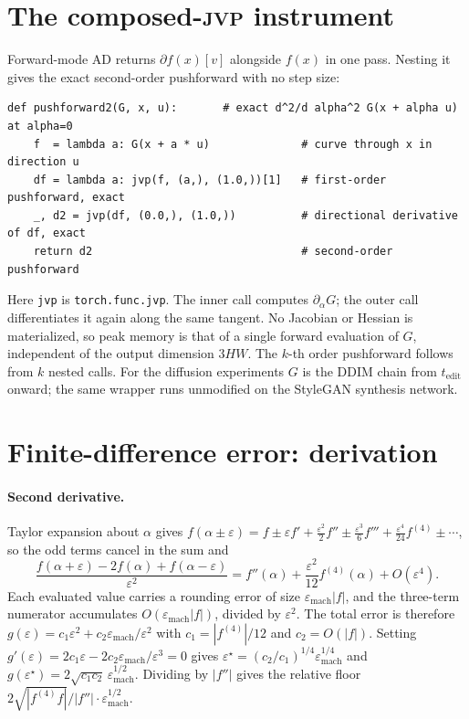 \documentclass[10pt]{article} %
\newcommand{\jvp}{\textsc{jvp}}
\newcommand{\eps}{\varepsilon}
\begin{document}
\section{The composed-\jvp{} instrument}
\label{app:code}
Forward-mode AD returns $\partial f(x)[v]$ alongside $f(x)$ in one pass. Nesting it
gives the exact second-order pushforward with no step size:
\begin{verbatim}
def pushforward2(G, x, u):       # exact d^2/d alpha^2 G(x + alpha u) at alpha=0
    f  = lambda a: G(x + a * u)              # curve through x in direction u
    df = lambda a: jvp(f, (a,), (1.0,))[1]   # first-order pushforward, exact
    _, d2 = jvp(df, (0.0,), (1.0,))          # directional derivative of df, exact
    return d2                                # second-order pushforward
\end{verbatim}
Here \texttt{jvp} is \texttt{torch.func.jvp}. The inner call computes
$\partial_\alpha G$; the outer call differentiates it again along the same tangent.
No Jacobian or Hessian is materialized, so peak memory is that of a single forward
evaluation of $G$, independent of the output dimension $3HW$. The $k$-th order
pushforward follows from $k$ nested calls. For the diffusion experiments $G$ is the
DDIM chain from $t_{\mathrm{edit}}$ onward; the same wrapper runs unmodified on the
StyleGAN synthesis network.

\section{Finite-difference error: derivation}
\label{app:deriv}
\paragraph{Second derivative.} Taylor expansion about $\alpha$ gives
$f(\alpha\pm\eps)=f\pm\eps f'+\tfrac{\eps^2}{2}f''\pm\tfrac{\eps^3}{6}f'''
+\tfrac{\eps^4}{24}f^{(4)}\pm\cdots$, so the odd terms cancel in the sum and
\[
\frac{f(\alpha+\eps)-2f(\alpha)+f(\alpha-\eps)}{\eps^2}
= f''(\alpha)+\frac{\eps^2}{12}f^{(4)}(\alpha)+O(\eps^4).
\]
Each evaluated value carries a rounding error of size $\eps_{\mathrm{mach}}|f|$, and
the three-term numerator accumulates $O(\eps_{\mathrm{mach}}|f|)$, divided by
$\eps^2$. The total error is therefore
$g(\eps)=c_1\eps^2+c_2\eps_{\mathrm{mach}}/\eps^2$ with $c_1=|f^{(4)}|/12$ and
$c_2=O(|f|)$. Setting $g'(\eps)=2c_1\eps-2c_2\eps_{\mathrm{mach}}/\eps^3=0$ gives
$\eps^\star=(c_2/c_1)^{1/4}\eps_{\mathrm{mach}}^{1/4}$ and
$g(\eps^\star)=2\sqrt{c_1c_2}\,\eps_{\mathrm{mach}}^{1/2}$. Dividing by $|f''|$
gives the relative floor $2\sqrt{|f^{(4)}f|}/|f''|\cdot\eps_{\mathrm{mach}}^{1/2}$.
\end{document}
